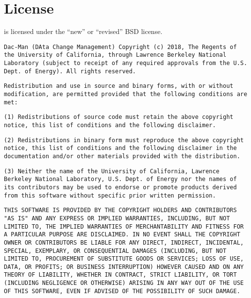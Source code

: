 \section{License}
\systemname is licensed under the ``new'' or ``revised'' BSD license.
\newline

\noindent \texttt{\footnotesize Dac-Man (DAta Change Management)
Copyright (c) 2018, The Regents of the University of California,
through Lawrence Berkeley National Laboratory (subject to receipt
of any required approvals from the U.S. Dept. of Energy). All rights
reserved.}\newline

\noindent \texttt{\footnotesize Redistribution and use in source and binary forms, with or without
modification, are permitted provided that the following conditions
are met:}\newline

\noindent \texttt{\footnotesize (1) Redistributions of source code must retain the above copyright
notice, this list of conditions and the following disclaimer.}\newline

\noindent \texttt{\footnotesize (2) Redistributions in binary form must reproduce the above copyright
notice, this list of conditions and the following disclaimer in the
documentation and/or other materials provided with the distribution.}\newline

\noindent \texttt{\footnotesize (3) Neither the name of the University of California, Lawrence Berkeley
National Laboratory, U.S. Dept. of Energy nor the names of its contributors
may be used to endorse or promote products derived from this software
without specific prior written permission.}\newline

\noindent \texttt{\footnotesize THIS SOFTWARE IS PROVIDED BY THE COPYRIGHT HOLDERS AND CONTRIBUTORS "AS IS"
AND ANY EXPRESS OR IMPLIED WARRANTIES, INCLUDING, BUT NOT LIMITED TO, THE
IMPLIED WARRANTIES OF MERCHANTABILITY AND FITNESS FOR A PARTICULAR PURPOSE
ARE DISCLAIMED. IN NO EVENT SHALL THE COPYRIGHT OWNER OR CONTRIBUTORS BE LIABLE
FOR ANY DIRECT, INDIRECT, INCIDENTAL, SPECIAL, EXEMPLARY, OR CONSEQUENTIAL
DAMAGES (INCLUDING, BUT NOT LIMITED TO, PROCUREMENT OF SUBSTITUTE GOODS OR
SERVICES; LOSS OF USE, DATA, OR PROFITS; OR BUSINESS INTERRUPTION) HOWEVER
CAUSED AND ON ANY THEORY OF LIABILITY, WHETHER IN CONTRACT, STRICT LIABILITY,
OR TORT (INCLUDING NEGLIGENCE OR OTHERWISE) ARISING IN ANY WAY OUT OF THE USE
OF THIS SOFTWARE, EVEN IF ADVISED OF THE POSSIBILITY OF SUCH DAMAGE.
}


